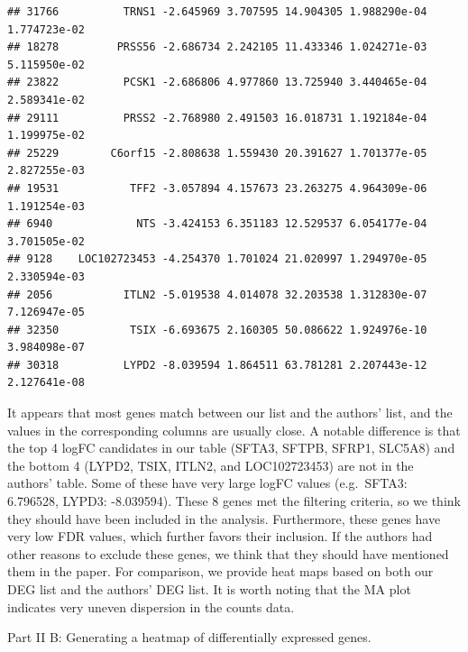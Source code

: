 \documentclass[
]{article}
\begin{document}
\begin{verbatim}
## 31766          TRNS1 -2.645969 3.707595 14.904305 1.988290e-04 1.774723e-02
## 18278         PRSS56 -2.686734 2.242105 11.433346 1.024271e-03 5.115950e-02
## 23822          PCSK1 -2.686806 4.977860 13.725940 3.440465e-04 2.589341e-02
## 29111          PRSS2 -2.768980 2.491503 16.018731 1.192184e-04 1.199975e-02
## 25229        C6orf15 -2.808638 1.559430 20.391627 1.701377e-05 2.827255e-03
## 19531           TFF2 -3.057894 4.157673 23.263275 4.964309e-06 1.191254e-03
## 6940             NTS -3.424153 6.351183 12.529537 6.054177e-04 3.701505e-02
## 9128    LOC102723453 -4.254370 1.701024 21.020997 1.294970e-05 2.330594e-03
## 2056           ITLN2 -5.019538 4.014078 32.203538 1.312830e-07 7.126947e-05
## 32350           TSIX -6.693675 2.160305 50.086622 1.924976e-10 3.984098e-07
## 30318          LYPD2 -8.039594 1.864511 63.781281 2.207443e-12 2.127641e-08
\end{verbatim}

It appears that most genes match between our list and the authors' list,
and the values in the corresponding columns are usually close. A notable
difference is that the top 4 logFC candidates in our table (SFTA3,
SFTPB, SFRP1, SLC5A8) and the bottom 4 (LYPD2, TSIX, ITLN2, and
LOC102723453) are not in the authors' table. Some of these have very
large \textbar logFC\textbar{} values (e.g.~SFTA3: 6.796528, LYPD3:
-8.039594). These 8 genes met the filtering criteria, so we think they
should have been included in the analysis. Furthermore, these genes have
very low FDR values, which further favors their inclusion. If the
authors had other reasons to exclude these genes, we think that they
should have mentioned them in the paper. For comparison, we provide heat
maps based on both our DEG list and the authors' DEG list. It is worth
noting that the MA plot indicates very uneven dispersion in the counts
data.

Part II B: Generating a heatmap of differentially expressed genes.
\end{document}
